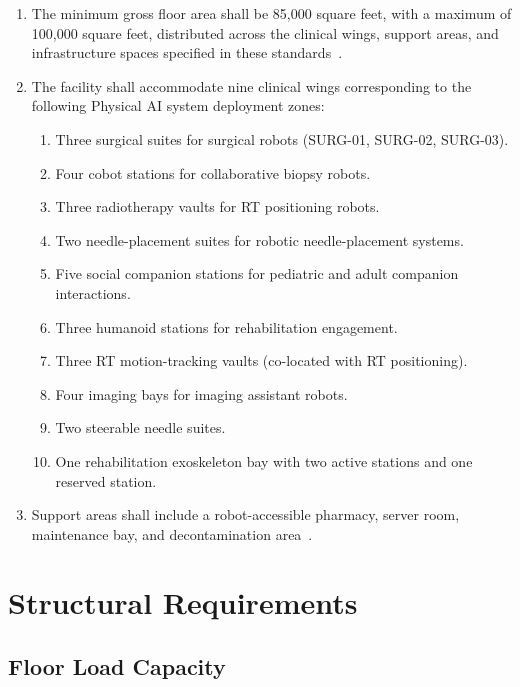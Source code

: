 \documentclass[11pt,letterpaper]{article}
\begin{document}
\begin{enumerate}[label=(\alph*)]
\item The minimum gross floor area shall be 85,000 square feet, with a maximum
  of 100,000 square feet, distributed across the clinical wings, support areas,
  and infrastructure spaces specified in these standards~\cite{sitespec2026}.

\item The facility shall accommodate nine clinical wings corresponding to the
  following Physical AI system deployment zones:
  \begin{enumerate}[label=(\arabic*)]
  \item Three surgical suites for surgical robots (SURG-01, SURG-02, SURG-03).
  \item Four cobot stations for collaborative biopsy robots.
  \item Three radiotherapy vaults for RT positioning robots.
  \item Two needle-placement suites for robotic needle-placement systems.
  \item Five social companion stations for pediatric and adult companion
    interactions.
  \item Three humanoid stations for rehabilitation engagement.
  \item Three RT motion-tracking vaults (co-located with RT positioning).
  \item Four imaging bays for imaging assistant robots.
  \item Two steerable needle suites.
  \item One rehabilitation exoskeleton bay with two active stations and one
    reserved station.
  \end{enumerate}

\item Support areas shall include a robot-accessible pharmacy, server room,
  maintenance bay, and decontamination area~\cite{newtrial2026}.
\end{enumerate}

\section{Structural Requirements}

\subsection{Floor Load Capacity}
\end{document}

